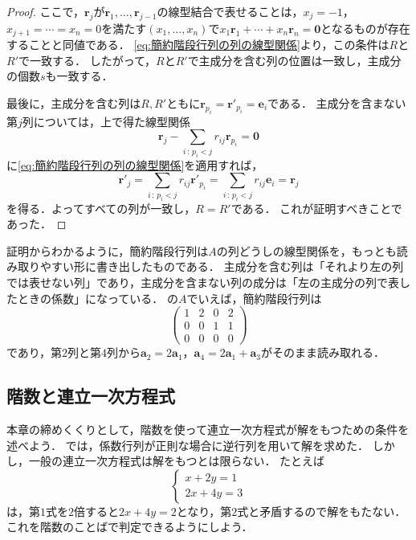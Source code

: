 \begin{tleftbar}
\begin{proof}
  ここで，$\bm{r}_j$が$\bm{r}_1, \dots, \bm{r}_{j-1}$の線型結合で表せることは，$x_j = -1$，$x_{j+1} = \cdots = x_n = 0$を満たす$(x_1, \dots, x_n)$で$x_1 \bm{r}_1 + \cdots + x_n \bm{r}_n = \bm{0}$となるものが存在することと同値である．
  \eqref{eq:簡約階段行列の列の線型関係}より，この条件は$R$と$R'$で一致する．
  したがって，$R$と$R'$で主成分を含む列の位置は一致し，主成分の個数$s$も一致する．

  最後に，主成分を含む列は$R,R'$ともに$\bm{r}_{p_i} = \bm{r}'_{p_i} = \bm{e}_i$である．
  主成分を含まない第$j$列については，上で得た線型関係
  \[
    \bm{r}_j - \sum_{i \,:\, p_i < j} r_{ij} \bm{r}_{p_i} = \bm{0}
  \]
  に\eqref{eq:簡約階段行列の列の線型関係}を適用すれば，
  \[
    \bm{r}'_j = \sum_{i \,:\, p_i < j} r_{ij} \bm{r}'_{p_i} = \sum_{i \,:\, p_i < j} r_{ij} \bm{e}_i = \bm{r}_j
  \]
  を得る．よってすべての列が一致し，$R = R'$である．
  これが証明すべきことであった．
\end{proof}
\end{tleftbar}

証明からわかるように，簡約階段行列は$A$の列どうしの線型関係を，もっとも読み取りやすい形に書き出したものである．
主成分を含む列は「それより左の列では表せない列」であり，主成分を含まない列の成分は「左の主成分の列で表したときの係数」になっている．
の$A$でいえば，簡約階段行列は
\[
  \begin{pmatrix}
    1 & 2 & 0 & 2 \\
    0 & 0 & 1 & 1 \\
    0 & 0 & 0 & 0
  \end{pmatrix}
\]
であり，第$2$列と第$4$列から$\bm{a}_2 = 2\bm{a}_1$，$\bm{a}_4 = 2\bm{a}_1 + \bm{a}_3$がそのまま読み取れる．

\subsection{階数と連立一次方程式}

本章の締めくくりとして，階数を使って連立一次方程式が解をもつための条件を述べよう．
では，係数行列が正則な場合に逆行列を用いて解を求めた．
しかし，一般の連立一次方程式は解をもつとは限らない．
たとえば
\[
  \begin{cases}
    x + 2y = 1 \\
    2x + 4y = 3
  \end{cases}
\]
は，第$1$式を$2$倍すると$2x + 4y = 2$となり，第$2$式と矛盾するので解をもたない．
これを階数のことばで判定できるようにしよう．

